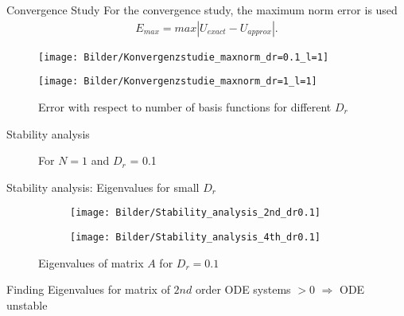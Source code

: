 \begin{frame}{Convergence Study}
	For the convergence study, the maximum norm error is used
	\begin{align*}
		E_{max} = max|U_{exact} - U_{approx}|.
	\end{align*}
	
	\begin{figure}
		\begin{minipage}{0.45\textwidth}
			\texttt{[image: Bilder/Konvergenzstudie\_maxnorm\_dr=0.1\_l=1]}
		\end{minipage}
		\hfill 
		\begin{minipage}{0.45\textwidth}
			\texttt{[image: Bilder/Konvergenzstudie\_maxnorm\_dr=1\_l=1]}
		\end{minipage}
		\caption{Error with respect to number of basis functions for different $D_r$}
	\end{figure}
\end{frame}


\begin{frame}{Stability analysis}
	\begin{figure}
		\centering
		\qquad
		\caption{For $N=1$ and $D_r$ = 0.1}
	\end{figure}
\end{frame}

\begin{frame}{Stability analysis: Eigenvalues for small $D_r$}
	\begin{figure}
		\begin{subfigure}{0.48\textwidth}
			\texttt{[image: Bilder/Stability\_analysis\_2nd\_dr0.1]}
		\end{subfigure}
		\hfill
		\begin{subfigure}{0.48\textwidth}
			\texttt{[image: Bilder/Stability\_analysis\_4th\_dr0.1]}
		\end{subfigure}
		\caption{Eigenvalues of matrix $A$ for $D_r = 0.1$}
	\end{figure}

	\begin{block}{Finding}
		Eigenvalues for matrix of $2nd$ order ODE systems $>0$ $\Rightarrow$ ODE unstable
	\end{block}
\end{frame}


